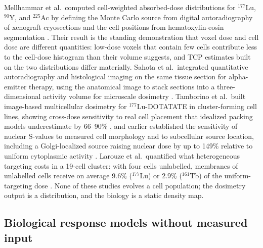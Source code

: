 \documentclass[11pt]{article}
\begin{document}
Mellhammar et al.\ computed cell-weighted absorbed-dose distributions for $^{177}$Lu,
$^{90}$Y, and $^{225}$Ac by defining the Monte Carlo source from digital autoradiography of
xenograft cryosections and the cell positions from hematoxylin-eosin segmentation
\cite{mellhammar2023}. Their result is the standing demonstration that voxel dose and cell
dose are different quantities: low-dose voxels that contain few cells contribute less to the
cell-dose histogram than their volume suggests, and TCP estimates built on the two
distributions differ materially. Sahota et al.\ integrated quantitative autoradiography and
histological imaging on the same tissue section for alpha-emitter therapy, using the
anatomical image to stack sections into a three-dimensional activity volume for microscale
dosimetry \cite{sahota2025}. Tamborino et al.\ built image-based multicellular dosimetry for
$^{177}$Lu-DOTATATE in cluster-forming cell lines, showing cross-dose sensitivity to real
cell placement that idealized packing models underestimate by 66--90\%
\cite{tamborino2025}, and earlier established the sensitivity of nuclear S-values to
measured cell morphology and to subcellular source location, including a Golgi-localized
source raising nuclear dose by up to 149\% relative to uniform cytoplasmic activity
\cite{tamborino2020}. Larouze et al.\ quantified what heterogeneous targeting costs in a
19-cell cluster: with four cells unlabelled, membranes of unlabelled cells receive on
average 9.6\% ($^{177}$Lu) or 2.9\% ($^{161}$Tb) of the uniform-targeting dose
\cite{larouze2023}. None of these studies evolves a cell population; the dosimetry output
is a distribution, and the biology is a static density map.

\subsection{Biological response models without measured input}
\end{document}

